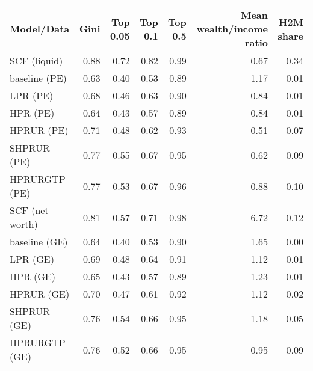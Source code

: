 \begin{tabular}{lrrrrrr}
\toprule
     Model/Data &  Gini &  Top 0.05 &  Top 0.1 &  Top 0.5 &  Mean wealth/income ratio &  H2M share \\
\midrule
   SCF (liquid) &  0.88 &      0.72 &     0.82 &     0.99 &                      0.67 &       0.34 \\
  baseline (PE) &  0.63 &      0.40 &     0.53 &     0.89 &                      1.17 &       0.01 \\
       LPR (PE) &  0.68 &      0.46 &     0.63 &     0.90 &                      0.84 &       0.01 \\
       HPR (PE) &  0.64 &      0.43 &     0.57 &     0.89 &                      0.84 &       0.01 \\
     HPRUR (PE) &  0.71 &      0.48 &     0.62 &     0.93 &                      0.51 &       0.07 \\
    SHPRUR (PE) &  0.77 &      0.55 &     0.67 &     0.95 &                      0.62 &       0.09 \\
  HPRURGTP (PE) &  0.77 &      0.53 &     0.67 &     0.96 &                      0.88 &       0.10 \\
SCF (net worth) &  0.81 &      0.57 &     0.71 &     0.98 &                      6.72 &       0.12 \\
  baseline (GE) &  0.64 &      0.40 &     0.53 &     0.90 &                      1.65 &       0.00 \\
       LPR (GE) &  0.69 &      0.48 &     0.64 &     0.91 &                      1.12 &       0.01 \\
       HPR (GE) &  0.65 &      0.43 &     0.57 &     0.89 &                      1.23 &       0.01 \\
     HPRUR (GE) &  0.70 &      0.47 &     0.61 &     0.92 &                      1.12 &       0.02 \\
    SHPRUR (GE) &  0.76 &      0.54 &     0.66 &     0.95 &                      1.18 &       0.05 \\
  HPRURGTP (GE) &  0.76 &      0.52 &     0.66 &     0.95 &                      0.95 &       0.09 \\
\bottomrule
\end{tabular}
